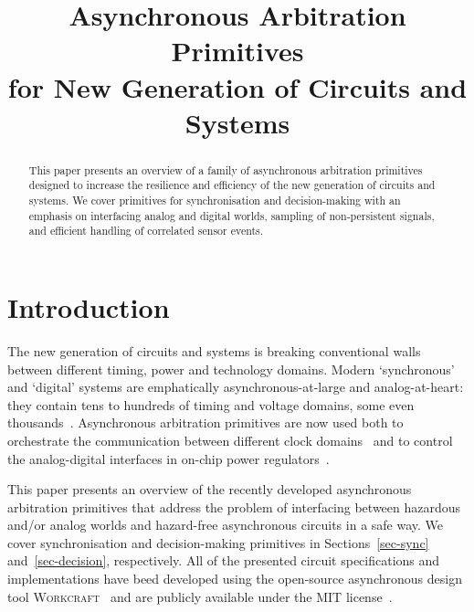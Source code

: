 \documentclass[conference]{IEEEtran}
\begin{document}
\title{Asynchronous Arbitration Primitives\\for New Generation of Circuits and Systems\vspace{-3mm}}
\author{
}

\maketitle

\begin{abstract}
This paper presents an overview of a family of asynchronous arbitration primitives designed
to increase the resilience and efficiency of the new generation of circuits and systems.
We cover primitives for synchronisation and decision-making with an emphasis on interfacing
analog and digital worlds, sampling of non-persistent signals, and efficient handling of
correlated sensor events.
\end{abstract}


\section{Introduction}

The new generation of circuits and systems is breaking conventional walls between
different timing, power and technology domains. Modern `synchronous' and `digital'
systems are emphatically asynchronous-at-large and analog-at-heart: they contain tens
to hundreds of timing and voltage domains, some even thousands~\cite{2017_bohnenstiehl_kilocore}.
Asynchronous arbitration primitives are now used both to orchestrate the communication
between different clock domains~\cite{2017_jiang_noc} and to control the analog-digital
interfaces in on-chip power regulators~\cite{2017_sokolov_a4a}.


This paper presents an overview of the recently developed asynchronous arbitration
primitives that address the problem of interfacing between hazardous and/or analog
worlds and hazard-free asynchronous circuits in a safe way. We cover synchronisation and
decision-making primitives in Sections~\ref{sec-sync} and~\ref{sec-decision}, respectively.
All of the presented circuit specifications and implementations have beed developed using
the open-source asynchronous design tool \textsc{Workcraft}~\cite{Workcraft_website} and are
publicly available under the MIT license~\cite{Arbitration_primitives_github}.
\end{document}
